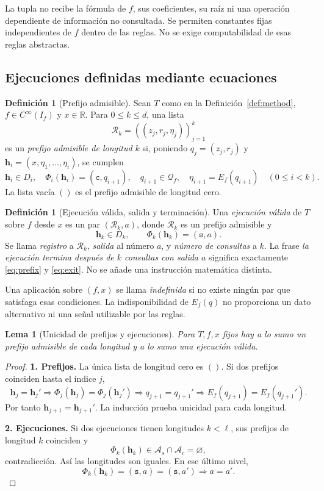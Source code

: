 \documentclass[11pt,a4paper]{article}
\numberwithin{equation}{section}
\newtheorem{lemma}[theorem]{Lema}
\theoremstyle{definition}
\newtheorem{definition}[theorem]{Definición}
\theoremstyle{remark}
\newcommand{\R}{\mathbb R}
\newcommand{\QQ}{\mathcal Q}
\newcommand{\Rec}{\mathcal R}
\newcommand{\hc}{\mathbf h}
\newcommand{\ct}{\mathtt c}
\newcommand{\st}{\mathtt s}
\newcommand{\paso}[1]{\par\smallskip\noindent\textbf{#1}\quad}
\begin{document}
La tupla no recibe la fórmula de $f$, sus coeficientes, su raíz ni una operación dependiente de información no consultada. Se permiten constantes fijas independientes de $f$ dentro de las reglas. No se exige computabilidad de esas reglas abstractas.

\subsection{Ejecuciones definidas mediante ecuaciones}
\begin{definition}[Prefijo admisible]\label{def:prefix}
Sean $T$ como en la Definición~\ref{def:method}, $f\in C^\infty(I_f)$ y $x\in\R$. Para $0\le k\le d$, una lista
\[
\Rec_k=((z_j,r_j,\eta_j))_{j=1}^{k}
\]
es un \emph{prefijo admisible de longitud $k$} si, poniendo $q_j=(z_j,r_j)$ y $\hc_i=(x,\eta_1,\ldots,\eta_i)$, se cumplen
\begin{equation}\label{eq:prefix}
\hc_i\in D_i,\quad
\Phi_i(\hc_i)=(\ct,q_{i+1}),\quad
q_{i+1}\in\QQ_f,\quad
\eta_{i+1}=E_f(q_{i+1})\quad(0\le i<k).
\end{equation}
La lista vacía $()$ es el prefijo admisible de longitud cero.
\end{definition}

\begin{definition}[Ejecución válida, salida y terminación]\label{def:execution}
Una \emph{ejecución válida} de $T$ sobre $f$ desde $x$ es un par $(\Rec_k,a)$, donde $\Rec_k$ es un prefijo admisible y
\begin{equation}\label{eq:exit}
\hc_k\in D_k,\qquad \Phi_k(\hc_k)=(\st,a).
\end{equation}
Se llama \emph{registro} a $\Rec_k$, \emph{salida} al número $a$, y \emph{número de consultas} a $k$. La frase \emph{la ejecución termina después de $k$ consultas con salida $a$} significa exactamente \eqref{eq:prefix} y \eqref{eq:exit}. No se añade una instrucción matemática distinta.

Una aplicación sobre $(f,x)$ se llama \emph{indefinida} si no existe ningún par que satisfaga esas condiciones. La indisponibilidad de $E_f(q)$ no proporciona un dato alternativo ni una señal utilizable por las reglas.
\end{definition}

\begin{lemma}[Unicidad de prefijos y ejecuciones]\label{lem:unique}
Para $T,f,x$ fijos hay a lo sumo un prefijo admisible de cada longitud y a lo sumo una ejecución válida.
\end{lemma}
\begin{proof}
\paso{1. Prefijos.}
La única lista de longitud cero es $()$. Si dos prefijos coinciden hasta el índice $j$,
\[
\hc_j=\hc_j'\Longrightarrow\Phi_j(\hc_j)=\Phi_j(\hc_j')
\Longrightarrow q_{j+1}=q_{j+1}'
\Longrightarrow E_f(q_{j+1})=E_f(q_{j+1}').
\]
Por tanto $\hc_{j+1}=\hc_{j+1}'$. La inducción prueba unicidad para cada longitud.
\paso{2. Ejecuciones.}
Si dos ejecuciones tienen longitudes $k<\ell$, sus prefijos de longitud $k$ coinciden y
\[
\Phi_k(\hc_k)\in\mathcal A_s\cap\mathcal A_c=\varnothing,
\]
contradicción. Así las longitudes son iguales. En ese último nivel,
\[
\Phi_k(\hc_k)=(\st,a)=(\st,a')\Longrightarrow a=a'.
\]
\end{proof}
\end{document}

